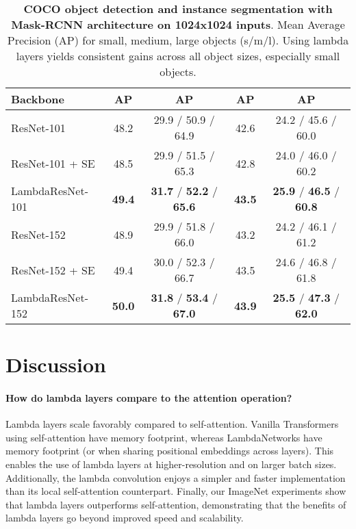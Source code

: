 \documentclass{article} \usepackage{iclr2021_conference,times}
\begin{document}
\begin{table}[ht!]
  \begin{center}
  \small
  \begin{tabular}{l|cc|cc}
    \toprule
    Backbone & AP & AP  & AP & AP \\
    \midrule
    ResNet-101 & 48.2 & 29.9 \textcolor{codegray}{/ 50.9 / 64.9} & 42.6 & 24.2 \textcolor{codegray}{/ 45.6 / 60.0} \\
    ResNet-101 + SE & 48.5 & 29.9 \textcolor{codegray}{/ 51.5 / 65.3} & 42.8 & 24.0 \textcolor{codegray}{/ 46.0 / 60.2} \\
    LambdaResNet-101 & \textbf{49.4} & \textbf{31.7} 
    \textcolor{codegray}{/ \textbf{52.2} / \textbf{65.6}} & \textbf{43.5} & \textbf{25.9} \textcolor{codegray}{/ \textbf{46.5} / \textbf{60.8}} \\
    \midrule
    ResNet-152 & 48.9 & 29.9 \textcolor{codegray}{/ 51.8 / 66.0} & 43.2 & 24.2 \textcolor{codegray}{/ 46.1 / 61.2} \\
    ResNet-152 + SE & 49.4 & 30.0 \textcolor{codegray}{/ 52.3 / 66.7} & 43.5 & 24.6 \textcolor{codegray}{/ 46.8 / 61.8} \\
    LambdaResNet-152 & \textbf{50.0} & \textbf{31.8} \textcolor{codegray}{/ \textbf{53.4} / \textbf{67.0}} & \textbf{43.9} & \textbf{25.5} \textcolor{codegray}{/ \textbf{47.3} / \textbf{62.0}} \\
    \bottomrule
  \end{tabular}
  \caption{
  \textbf{COCO object detection and instance segmentation with Mask-RCNN architecture on 1024x1024 inputs}. 
  Mean Average Precision (AP) for small, medium, large objects (s/m/l). Using lambda layers yields consistent gains across all object sizes, especially small objects.
  }
  \label{tab:detection}
  \vspace{-0.3cm}
  \end{center}
\end{table}
 \section{Discussion}

\paragraph{How do lambda layers compare to the attention operation?} 
Lambda layers scale favorably compared to self-attention.
Vanilla Transformers using self-attention have  memory footprint, whereas LambdaNetworks
have  memory footprint (or  when sharing positional embeddings across layers).
This enables the use of lambda layers at higher-resolution and on larger batch sizes.
Additionally, the lambda convolution enjoys a simpler and faster implementation than its local self-attention counterpart.
Finally, our ImageNet experiments show that lambda layers outperforms self-attention, demonstrating that the benefits of lambda layers go beyond improved speed and scalability.
\end{document}
